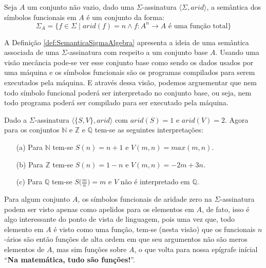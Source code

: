 \begin{definicao}\label{def:SemanticaSigmaAlgebra}
  Seja $A$ um conjunto não vazio, dado uma $\Sigma$-assinatura $\langle \Sigma, arid \rangle$, a semântica dos símbolos funcionais em $A$ é um conjunto da forma:
  \begin{equation}
    \Sigma_A = \{f \in \Sigma \mid arid(f) = n \land f: A^n \rightarrow A \text{ é uma função total}\}
  \end{equation}
\end{definicao}

A Definição \ref{def:SemanticaSigmaAlgebra} apresenta a ideia de uma semântica associada de uma $\Sigma$-assinatura com respeito a um conjunto base $A$. Usando uma visão mecância pode-se ver esse conjunto base como sendo os dados usados por uma máquina e os símbolos funcionais são os programas compilados para serem executados pela máquina. E através dessa visão, podemos arguementar que nem todo símbolo funcional poderá ser interpretado no conjunto base, ou seja, nem todo programa poderá ser compilado  para ser executado pela máquina.

\begin{exemplo}\label{exe:Algebra1}
  Dado a $\Sigma$-assinatura  $\langle \{S, V\}, arid \rangle$ com $arid(S) = 1$ e $arid(V) = 2$. Agora para os conjuntos $\mathbb{N}$ e $\mathbb{Z}$ e $\mathbb{Q}$ tem-se as seguintes interpretações:
  \begin{itemize}
    \item[(a)] Para $\mathbb{N}$ tem-se $S(n) = n + 1$ e $V(m, n) = max(m, n)$.
    \item[(b)] Para $\mathbb{Z}$ tem-se $S(n) = 1 - n $ e $V(m, n) = -2m + 3n$.
    \item[(c)] Para $\mathbb{Q}$ tem-se $S\Big(\frac{m}{n}\Big) = m$ e $V$ não é interpretado em $\mathbb{Q}$.
  \end{itemize}
\end{exemplo}

Para algum conjunto $A$, os símbolos funcionais de aridade zero na $\Sigma$-assinatura podem ser visto apenas como apelidos para os elementos em $A$, de fato, isso é algo interessante do ponto de vista de linguagem, pois uma vez que, todo elemento em $A$ é visto como uma função, tem-se (nesta visão) que os funcionais $n$-ários são então funções de alta ordem em que seu argumentos não são meros elementos de $A$, mas sim funções sobre $A$, o que volta para nossa epígrafe inícial ``\textbf{Na matemática, tudo são funções!}''.

